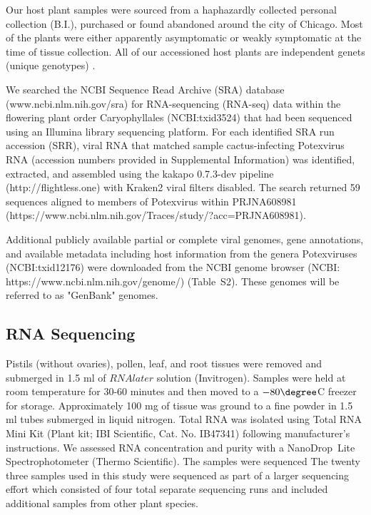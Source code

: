 \documentclass[fleqn,10pt,lineno]{wlpeerj}
\begin{document}
Our host plant samples were sourced from a haphazardly collected personal collection (B.I.), purchased or found abandoned around the city of Chicago. 
Most of the plants were either apparently asymptomatic or weakly symptomatic at the time of tissue collection.
All of our accessioned host plants are independent genets (unique genotypes) \citep{ramanauskas2021}.


We searched the NCBI Sequence Read Archive (SRA) database (www.ncbi.nlm.nih.gov/sra) for RNA-sequencing (RNA-seq) data within the flowering plant order Caryophyllales (NCBI:txid3524) that had been sequenced using an Illumina library sequencing platform. 
For each identified SRA run accession (SRR), viral RNA that matched sample cactus-infecting Potexvirus RNA (accession numbers provided in Supplemental Information) was identified, extracted, and assembled using the kakapo 0.7.3-dev pipeline (http://flightless.one) with Kraken2 viral filters disabled. 
The search returned 59 sequences aligned to members of Potexvirus within PRJNA608981 (https://www.ncbi.nlm.nih.gov/Traces/study/?acc=PRJNA608981).


Additional publicly available partial or complete viral genomes, gene annotations, and available metadata including host information from the genera Potexviruses (NCBI:txid12176) were downloaded from the NCBI genome browser (NCBI: https://www.ncbi.nlm.nih.gov/genome/) (Table~S2).
These genomes will be referred to as "GenBank" genomes.

\subsection*{RNA Sequencing}

Pistils (without ovaries), pollen, leaf, and root tissues were removed and submerged in 1.5 ml of $RNA\textit{later}${\texttrademark} solution (Invitrogen).
Samples were held at room temperature for 30-60 minutes and then moved to a $-80\degree$C freezer for storage.
Approximately 100 mg of tissue was ground to a fine powder in 1.5 ml tubes submerged in liquid nitrogen.
Total RNA was isolated using Total RNA Mini Kit (Plant kit; IBI Scientific, Cat. No. IB47341) following manufacturer's instructions.
We assessed RNA concentration and purity with a NanoDrop\texttrademark~Lite Spectrophotometer (Thermo Scientific).
The samples were sequenced
The twenty three samples used in this study were sequenced as part of a larger sequencing effort which consisted of four total separate sequencing runs and included additional samples from other plant species. 
\end{document}
